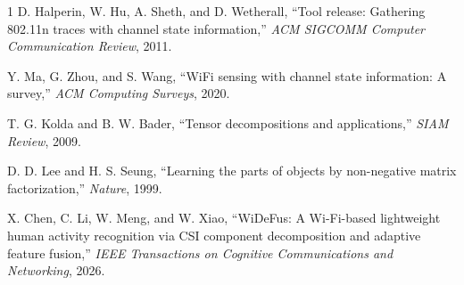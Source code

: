 \documentclass[10pt,journal]{IEEEtran}
\begin{document}

\begin{thebibliography}{1}
D. Halperin, W. Hu, A. Sheth, and D. Wetherall, ``Tool release: Gathering 802.11n traces with channel state information,'' \emph{ACM SIGCOMM Computer Communication Review}, 2011.

Y. Ma, G. Zhou, and S. Wang, ``WiFi sensing with channel state information: A survey,'' \emph{ACM Computing Surveys}, 2020.

T. G. Kolda and B. W. Bader, ``Tensor decompositions and applications,'' \emph{SIAM Review}, 2009.

D. D. Lee and H. S. Seung, ``Learning the parts of objects by non-negative matrix factorization,'' \emph{Nature}, 1999.

X. Chen, C. Li, W. Meng, and W. Xiao, ``WiDeFus: A Wi-Fi-based lightweight human activity recognition via CSI component decomposition and adaptive feature fusion,'' \emph{IEEE Transactions on Cognitive Communications and Networking}, 2026.
\end{thebibliography}
\end{document}
